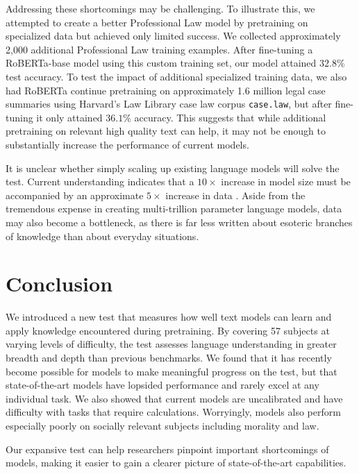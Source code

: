 Addressing these shortcomings may be challenging. To illustrate this, we attempted to create a better Professional Law model by pretraining on specialized data but achieved only limited success. We collected approximately 2,000 additional Professional Law training examples. After fine-tuning a RoBERTa-base model \citep{RobertaLiu2019AR} using this custom training set, our model attained $32.8\%$ test accuracy. To test the impact of additional specialized training data, we also had RoBERTa continue pretraining on approximately 1.6 million legal case summaries using Harvard’s Law Library case law corpus \texttt{case.law}, but after fine-tuning it only attained $36.1\%$ accuracy. This suggests that while additional pretraining on relevant high quality text can help, it may not be enough to substantially increase the performance of current models. 

It is unclear whether simply scaling up existing language models will solve the test. Current understanding indicates that a $10\times$ increase in model size must be accompanied by an approximate $5\times$ increase in data \citep{kaplan2020scalinglaws}. Aside from the tremendous expense in creating multi-trillion parameter language models, data may also become a bottleneck, as there is far less written about esoteric branches of knowledge than about everyday situations.

\section{Conclusion}

We introduced a new test that measures how well text models can learn and apply knowledge encountered during pretraining. By covering 57 subjects at varying levels of difficulty, the test assesses language understanding in greater breadth and depth than previous benchmarks. We found that it has recently become possible for models to make meaningful progress on the test, but that state-of-the-art models have lopsided performance and rarely excel at any individual task. We also showed that current models are uncalibrated and have difficulty with tasks that require calculations. Worryingly, models also perform especially poorly on socially relevant subjects including morality and law.

Our expansive test can help researchers pinpoint important shortcomings of models, making it easier to gain a clearer picture of state-of-the-art capabilities.


